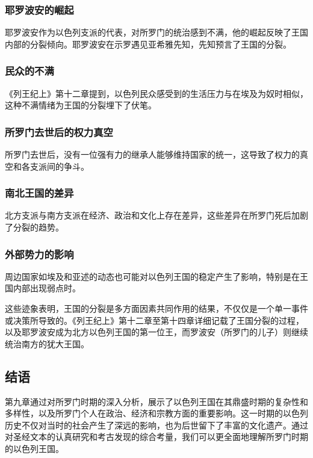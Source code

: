 \documentclass[12pt, a4paper]{ctexart}
\begin{document}
\subsubsection{耶罗波安的崛起}
耶罗波安作为以色列支派的代表，对所罗门的统治感到不满，他的崛起反映了王国内部的分裂倾向。耶罗波安在示罗遇见亚希雅先知，先知预言了王国的分裂。

\subsubsection{民众的不满}
《列王纪上》第十二章提到，以色列民众感受到的生活压力与在埃及为奴时相似，这种不满情绪为王国的分裂埋下了伏笔。

\subsubsection{所罗门去世后的权力真空}
所罗门去世后，没有一位强有力的继承人能够维持国家的统一，这导致了权力的真空和各支派间的争斗。

\subsubsection{南北王国的差异}
北方支派与南方支派在经济、政治和文化上存在差异，这些差异在所罗门死后加剧了分裂的趋势。

\subsubsection{外部势力的影响}
周边国家如埃及和亚述的动态也可能对以色列王国的稳定产生了影响，特别是在王国内部出现弱点时。

这些迹象表明，王国的分裂是多方面因素共同作用的结果，不仅仅是一个单一事件或决策所导致的。《列王纪上》第十二章至第十四章详细记载了王国分裂的过程，以及耶罗波安成为北方以色列王国的第一位王，而罗波安（所罗门的儿子）则继续统治南方的犹大王国。


\subsection{结语}
第九章通过对所罗门时期的深入分析，展示了以色列王国在其鼎盛时期的复杂性和多样性，以及所罗门个人在政治、经济和宗教方面的重要影响。这一时期的以色列历史不仅对当时的社会产生了深远的影响，也为后世留下了丰富的文化遗产。通过对圣经文本的认真研究和考古发现的综合考量，我们可以更全面地理解所罗门时期的以色列王国。
\end{document}
